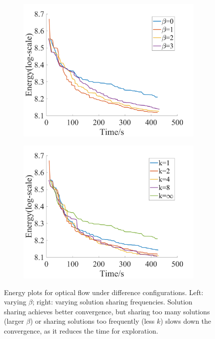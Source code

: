 \begin{figure}[!ht]
\centering
\begin{subfigure}[b]{0.49\columnwidth}
\includegraphics[width=\columnwidth]{figure/optical_flow_by_beta.png}
\end{subfigure}
\begin{subfigure}[b]{0.49\columnwidth}
\includegraphics[width=\columnwidth]{figure/optical_flow_by_interval.png}
\end{subfigure}
\caption{Energy
  plots for optical flow under difference configurations. Left:
  varying $\beta$; right: varying solution sharing
  frequencies. Solution sharing achieves better convergence, but
  sharing too many solutions (larger $\beta$) or sharing solutions too
  frequently (less $k$) slows down the convergence, as it reduces the
  time for exploration.} \label{fig:opticalflow_configuration}
\end{figure}
